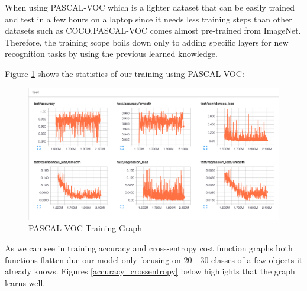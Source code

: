 \newpage
When using PASCAL-VOC which is a lighter dataset that can be easily trained and test in a few hours on a laptop since it needs less training steps than other datasets such as COCO,PASCAL-VOC comes almost pre-trained from ImageNet. Therefore, the training scope boils down only to adding specific layers for new recognition tasks by using the previous learned knowledge.

Figure \ref{test_graph} shows the statistics of our training using PASCAL-VOC:
\begin{figure}[h]
\centering
\includegraphics[scale=0.2]{figures/test_graph.png}
\caption{PASCAL-VOC Training Graph}
\label{test_graph}
\end{figure}

As we can see in training accuracy and cross-entropy cost function graphs both functions flatten due our model only focusing on 20 - 30  classes of a few  objects it already knows. Figures \ref{accuracy_crossentropy} below highlights that the graph learns well.

